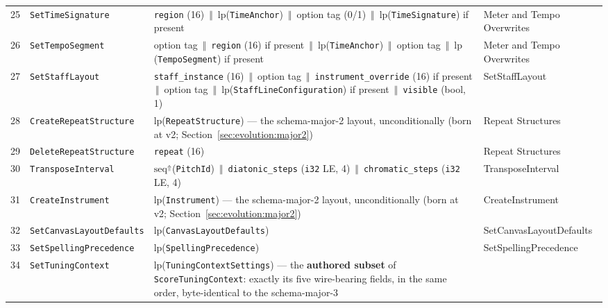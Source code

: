 \documentclass[11pt,letterpaper]{report}
\newcommand{\tablenums}[1]{{\addfontfeatures{Numbers={Lining,Tabular}}#1}}
\newcommand{\sectionsc}[1]{{\addfontfeatures{Letters=SmallCaps}#1}}
\newcommand{\cat}{\ensuremath{\,\Vert\,}}
\begin{document}
\begin{longtable}{p{0.32in} >{\raggedright\arraybackslash}p{1.5in} >{\raggedright\arraybackslash}p{2.35in} >{\raggedright\arraybackslash}p{1.35in}}
  \tablenums{25} & \texttt{SetTimeSignature} &
    \texttt{region} (16) \cat{} $\mathrm{lp}$(\texttt{TimeAnchor}) \cat{}
    option tag (\tablenums{0}/\tablenums{1}) \cat{}
    $\mathrm{lp}$(\texttt{TimeSignature}) if present &
    \sectionsc{Meter and Tempo Overwrites} \\
  \tablenums{26} & \texttt{SetTempoSegment} &
    option tag \cat{} \texttt{region} (16) if present \cat{}
    $\mathrm{lp}$(\texttt{TimeAnchor}) \cat{} option tag \cat{}
    $\mathrm{lp}$(\texttt{TempoSegment}) if present &
    \sectionsc{Meter and Tempo Overwrites} \\
  \tablenums{27} & \texttt{SetStaffLayout} &
    \texttt{staff\_instance} (16) \cat{} option tag \cat{}
    \texttt{instrument\_override} (16) if present \cat{} option tag \cat{}
    $\mathrm{lp}$(\texttt{StaffLineConfiguration}) if present \cat{}
    \texttt{visible} (bool, 1) &
    \sectionsc{SetStaffLayout} \\
  \tablenums{28} & \texttt{CreateRepeatStructure} &
    $\mathrm{lp}$(\texttt{RepeatStructure}) --- the schema-major-2
    layout, unconditionally (born at v2;
    Section~\ref{sec:evolution:major2}) &
    \sectionsc{Repeat Structures} \\
  \tablenums{29} & \texttt{DeleteRepeatStructure} &
    \texttt{repeat} (16) &
    \sectionsc{Repeat Structures} \\
  \tablenums{30} & \texttt{TransposeInterval} &
    $\mathrm{seq}^{\Uparrow}$(\texttt{PitchId}) \cat{}
    \texttt{diatonic\_steps} (\texttt{i32} LE, 4) \cat{}
    \texttt{chromatic\_steps} (\texttt{i32} LE, 4) &
    \sectionsc{TransposeInterval} \\
  \tablenums{31} & \texttt{CreateInstrument} &
    $\mathrm{lp}$(\texttt{Instrument}) --- the schema-major-2 layout,
    unconditionally (born at v2; Section~\ref{sec:evolution:major2}) &
    \sectionsc{CreateInstrument} \\
  \tablenums{32} & \texttt{SetCanvasLayoutDefaults} &
    $\mathrm{lp}$(\texttt{CanvasLayoutDefaults}) &
    \sectionsc{SetCanvasLayoutDefaults} \\
  \tablenums{33} & \texttt{SetSpellingPrecedence} &
    $\mathrm{lp}$(\texttt{SpellingPrecedence}) &
    \sectionsc{SetSpellingPrecedence} \\
  \tablenums{34} & \texttt{SetTuningContext} &
    $\mathrm{lp}$(\texttt{TuningContextSettings}) --- the \textbf{authored
    subset} of \texttt{ScoreTuningContext}: exactly its five wire-bearing
    fields, in the same order, byte-identical to the schema-major-3

\end{longtable}
\end{document}
